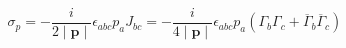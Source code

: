 \begin{equation}
\sigma _p=-\frac i{2\mid \mathbf{p}\mid }\epsilon
_{abc}p_aJ_{bc}=-\frac i{4\mid \mathbf{p}\mid }\epsilon
_{abc}p_a\left( \Gamma _b\Gamma _c+ \overline{\Gamma
}_b\overline{\Gamma }_c\right)  \label{68}
\end{equation}

